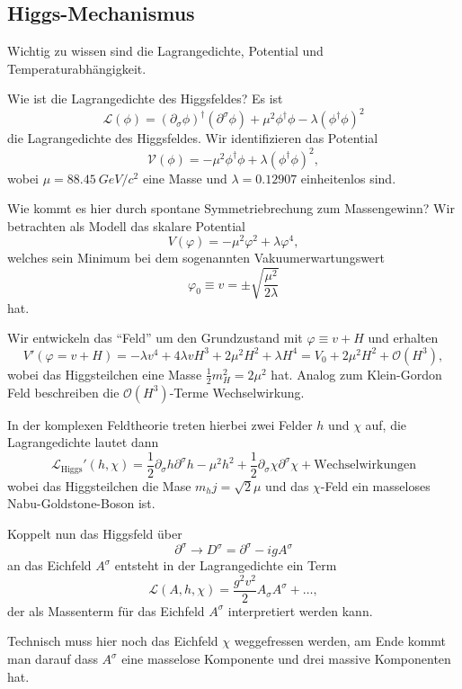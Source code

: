 

\subsection{Higgs-Mechanismus}

Wichtig zu wissen sind die Lagrangedichte, Potential und Temperaturabhängigkeit.

\begin{fquestion}{Wie ist die Lagrangedichte des Higgsfeldes?}
    Es ist 
    $$\mathcal{L}(\phi) = (\partial_\sigma \phi)^\dagger (\partial^\sigma \phi) + \mu^2 \phi^\dagger \phi - \lambda (\phi^\dagger \phi)^2$$
    die Lagrangedichte des Higgsfeldes.
    Wir identifizieren das Potential
    $$\mathcal{V}(\phi) = -\mu^2 \phi^\dagger \phi + \lambda (\phi^\dagger \phi)^2,$$
    wobei $\mu = \SI{88.45}{GeV/c^2}$ eine Masse und $\lambda = 0.12907$ einheitenlos sind.
\end{fquestion}

\begin{fquestion}{Wie kommt es hier durch spontane Symmetriebrechung zum Massengewinn?}
    Wir betrachten als Modell das skalare Potential 
    $$V(\varphi) = -\mu^2 \varphi^2 + \lambda \varphi^4,$$
    welches sein Minimum bei dem sogenannten Vakuumerwartungswert
    $$\varphi_0 \equiv v = \pm \sqrt{\frac{\mu^2}{2\lambda}}$$
    hat.
    
    Wir entwickeln das ``Feld'' um den Grundzustand mit $\varphi \equiv v + H$ und erhalten
    $$V'(\varphi = v + H) = -\lambda v^4 + 4 \lambda v H^3 + 2 \mu^2 H^2 + \lambda H^4 = V_0 + 2 \mu^2 H^2 + \mathcal{O}(H^3),$$
    wobei das Higgsteilchen eine Masse $\frac{1}{2} m_H^2 = 2 \mu^2$ hat.
    Analog zum Klein-Gordon Feld beschreiben die $\mathcal{O}(H^3)$-Terme Wechselwirkung.
    
    In der komplexen Feldtheorie treten hierbei zwei Felder $h$ und $\chi$ auf, die Lagrangedichte lautet dann
    $$\mathcal{L}_{\mathrm{Higgs}}'(h, \chi) = \frac{1}{2} \partial_\sigma h \partial^\sigma h - \mu^2 h^2 + \frac{1}{2} \partial_\sigma \chi \partial^\sigma \chi + \mathrm{Wechselwirkungen}$$
    wobei das Higgsteilchen die Mase $m_hj = \sqrt{2} \mu$ und das $\chi$-Feld ein masseloses Nabu-Goldstone-Boson ist.
    
    Koppelt nun das Higgsfeld über
    $$\partial^\sigma \rightarrow D^\sigma = \partial^\sigma - i g A^\sigma$$
    an das Eichfeld $A^\sigma$ entsteht in der Lagrangedichte ein Term
    $$\mathcal{L}(A, h, \chi) = \frac{g^2 v^2}{2} A_\sigma A^\sigma + \ldots,$$
    der als Massenterm für das Eichfeld $A^\sigma$ interpretiert werden kann.
    
    Technisch muss hier noch das Eichfeld $\chi$ weggefressen werden, am Ende kommt man darauf dass $A^\sigma$ eine masselose Komponente und drei massive Komponenten hat.
\end{fquestion}

